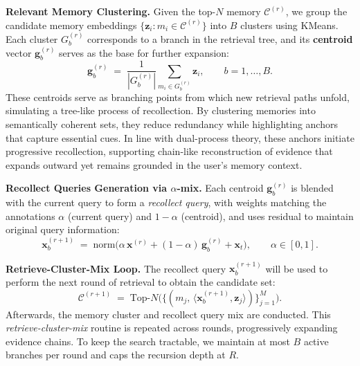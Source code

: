 \textbf{Relevant Memory Clustering.}
Given the top-$N$ memory $\mathcal{C}^{(r)}$, we group the candidate memory embeddings $\{\mathbf{z}_i: m_i\in\mathcal{C}^{(r)}\}$ into $B$ clusters using KMeans. Each cluster $G_b^{(r)}$ corresponds to a branch in the retrieval tree, and its \textbf{centroid} vector $\mathbf{g}_b^{(r)}$ serves as the base for further expansion:
\begin{equation}
\mathbf{g}_b^{(r)} \;=\; \frac{1}{|G_b^{(r)}|}\sum_{m_i\in G_b^{(r)}} \mathbf{z}_i, 
\qquad b=1,\dots,B .
\end{equation}
These centroids serve as branching points from which new retrieval paths unfold, simulating a tree-like process of recollection. By clustering memories into semantically coherent sets, they reduce redundancy while highlighting anchors that capture essential cues. In line with dual-process theory, these anchors initiate progressive recollection, supporting chain-like reconstruction of evidence that expands outward yet remains grounded in the user's memory context.

\textbf{Recollect Queries Generation via $\alpha$-mix.}
Each centroid $\mathbf{g}_b^{(r)}$ is blended with the current query to form a \emph{recollect query}, with weights matching the annotations $\alpha$ (current query) and $1-\alpha$ (centroid), and uses residual to maintain original query information:
\begin{equation}
\mathbf{x}_b^{(r+1)} \;=\; \mathrm{norm}\!\big(\alpha\,\mathbf{x}^{(r)} + (1-\alpha)\,\mathbf{g}_b^{(r)} + \mathbf{x}_t \big), \qquad \alpha\in[0,1].
\end{equation}

\textbf{Retrieve-Cluster-Mix Loop.}
The recollect query $\mathbf{x}_b^{(r+1)}$ will be used to perform the next round of retrieval to obtain the candidate set:
\begin{equation}
\mathcal{C}^{(r+1)} \;=\; \text{Top-}N\Big(\{(m_j,\,\langle \mathbf{x}_b^{(r+1)},\mathbf{z}_j\rangle)\}_{j=1}^{M}\Big).
\end{equation}
Afterwards, the memory cluster and recollect query mix are conducted. This \emph{retrieve-cluster-mix} routine is repeated across rounds, progressively expanding evidence chains.  
To keep the search tractable, we maintain at most $B$ active branches per round and caps the recursion depth at $R$. 


